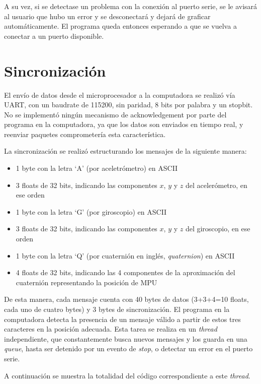 \documentclass{article}
\begin{document}
A su vez, si se detectase un problema con la conexi\'on al puerto serie, se le avisar\'a al usuario que hubo un error y se desconectar\'a y dejar\'a de graficar autom\'aticamente. El programa queda entonces esperando a que se vuelva a conectar a un puerto disponible.


\section{Sincronizaci\'on}

El env\'io de datos desde el microprocesador a la computadora se realiz\'o v\'ia UART, con un baudrate de 115200, sin paridad, 8 bits por palabra y un stopbit. No se implement\'o ning\'un mecanismo de acknowledgement por parte del programa en la computadora, ya que los datos son enviados en tiempo real, y reenviar paquetes comprometer\'ia esta caracter\'istica.

La sincronizaci\'on se realiz\'o estructurando los mensajes de la siguiente manera:
\begin{itemize}
	\item 1 byte con la letra `A' (por aceletr\'ometro) en ASCII
	\item 3 floats de 32 bits, indicando las componentes $x$, $y$ y $z$ del aceler\'ometro, en ese orden
	\item 1 byte con la letra `G' (por giroscopio) en ASCII
	\item 3 floats de 32 bits, indicando las componentes $x$, $y$ y $z$ del giroscopio, en ese orden
	\item 1 byte con la letra `Q' (por cuaterni\'on en ingl\'es, \textit{quaternion}) en ASCII
	\item 4 floats de 32 bits, indicando las 4 componentes de la aproximaci\'on del cuaterni\'on representando la posici\'on de MPU
\end{itemize}

De esta manera, cada mensaje cuenta con 40 bytes de datos (3+3+4=10 floats, cada uno de cuatro bytes) y 3 bytes de sincronizaci\'on. El programa en la computadora detecta la presencia de un mensaje v\'alido a partir de estos tres caracteres en la posici\'on  adecuada. Esta tarea se realiza en un \emph{thread} independiente, que constantemente busca nuevos mensajes y los guarda en una \emph{queue}, hasta ser detenido por un evento de \emph{stop}, o detectar un error en el puerto serie.

A continuaci\'on se muestra la totalidad del c\'odigo correspondiente a este \emph{thread}. 
\end{document}
